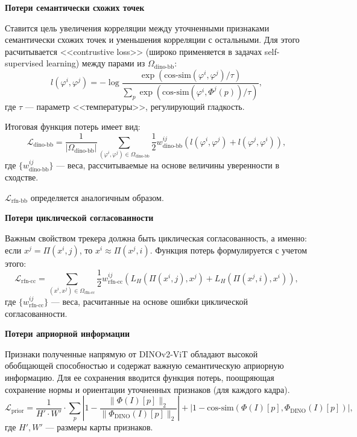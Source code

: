 \documentclass[a4paper, 14pt]{extarticle}
\theoremstyle{definition}
\theoremstyle{plain}
\theoremstyle{remark}
\begin{document}
\textbf{Потери семантически схожих точек}

Ставится цель увеличения корреляции между уточненными признаками семантически схожих точек и уменьшения корреляции с остальными. Для этого расчитывается <<contrustive loss>> (широко применяется в задачах self-supervised learning) между парами из $\Omega_{\text{dino-bb}}$:
\begin{equation} \label{eq:bb-loss}
	l(\varphi^i, \varphi^j) = -\log \frac{\exp(\text{cos-sim}(\varphi^i, \varphi^j) / \tau)}{\sum_p \exp(\text{cos-sim}(\varphi^i, \Phi^j(p)) / \tau)},
\end{equation}
где $\tau$ --- параметр <<температуры>>, регулирующий гладкость.

Итоговая функция потерь имеет вид:
\begin{equation}
	\mathcal{L}_{\text{dino-bb}} = \frac{1}{|\Omega_{\text{dino-bb}}|} \sum_{(\varphi^i, \varphi^j) \in \Omega_{\text{dino-bb}}} \frac{1}{2} w_{\text{dino-bb}}^{ij} \left( l(\varphi^i, \varphi^j) + l(\varphi^j, \varphi^i) \right),
\end{equation}
где $\{w_{\text{dino-bb}}^{ij}\}$ --- веса, рассчитываемые на основе величины уверенности в сходстве.

$\mathcal{L}_{\text{rfn-bb}}$ определяется аналогичным образом.

\textbf{Потери циклической согласованности}

Важным свойством трекера должна быть циклическая согласованность, а именно: если $x^j = \Pi(x^i,j)$, то $x^i\approx\Pi(x^j,i)$. Функция потерь формулируется с учетом этого:
\begin{equation}
	\mathcal{L}_{\text{rfn-cc}} = \sum_{(x^i, x^j) \in \Omega_{\text{rfn-cc}}} \frac{1}{2} w_{\text{rfn-cc}}^{ij} \left( L_H(\Pi(x^i, j), x^j) + L_H(\Pi(x^j, i), x^i) \right),
\end{equation}
где $\{w_{\text{rfn-cc}}^{ij}\}$ --- веса, расчитанные на основе ошибки циклической согласованности.

\textbf{Потери априорной информации}

Признаки полученные напрямую от DINOv2-ViT обладают высокой обобщающей способностью и содержат важную семантическую априорную информацию. Для ее сохранения вводится функция потерь, поощряющая сохранение нормы и ориентации уточненных признаков (для каждого кадра).
\begin{equation}
	\mathcal{L}_{\text{prior}} = \frac{1}{H' \cdot W'} \cdot \sum_p \left| 1 - \frac{\|\Phi(I)[p]\|_2}{\|\Phi_{\text{DINO}}(I)[p]\|_2}\right| + \left| 1 - \text{cos-sim}(\Phi(I)[p], \Phi_{\text{DINO}}(I)[p])\right|,
\end{equation}
где $H', W'$ --- размеры карты признаков.
\end{document}
